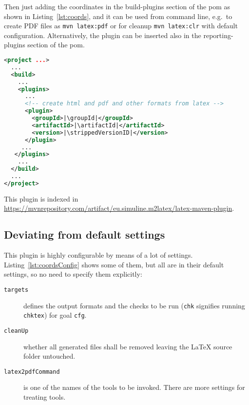 Then just adding the coordinates in the build-plugins section of the pom
as shown in Listing~\ref{lst:coords}, 
and it can be used from command line,
e.g.~to create PDF files as \texttt{mvn latex:pdf}
or for cleanup \texttt{mvn latex:clr} with default configuration. 
Alternatively, the plugin can be inserted also 
in the reporting-plugins section of the pom. 
%
\begin{lstlisting}[language=xml, basicstyle=\footnotesize,
escapechar=|,
float, captionpos=b, label={lst:coords}, 
caption={The coordinates of this plugin}]
<project ...>
  ...
  <build>
    ...
    <plugins>
      ...
      <!-- create html and pdf and other formats from latex -->
      <plugin>
        <groupId>|\groupId|</groupId>
        <artifactId>|\artifactId|</artifactId>
        <version>|\strippedVersionID|</version>
      </plugin>
     ...
   </plugins>
    ...
  </build>
  ...
</project>
\end{lstlisting}

This plugin is indexed 
in \url{https://mvnrepository.com/artifact/eu.simuline.m2latex/latex-maven-plugin}. 

\subsection{Deviating from default settings}\label{subsec:xmlPomSettings}

This plugin is highly configurable by means of a lot of settings. 
Listing~\ref{lst:coordsConfig} shows some of them, but all are in their default settings, 
so no need to specify them explicitly: 
%
\begin{description}
\item[\texttt{targets}] defines the output formats and the checks to be run 
(\texttt{chk} signifies running \texttt{chktex}) for goal \texttt{cfg}. 
\item[\texttt{cleanUp}] whether all generated files shall be removed 
leaving the \LaTeX{} source folder untouched. 
\item[\texttt{latex2pdfCommand}] is one of the names of the tools to be invoked. 
There are more settings for treating tools. 
\end{description}

